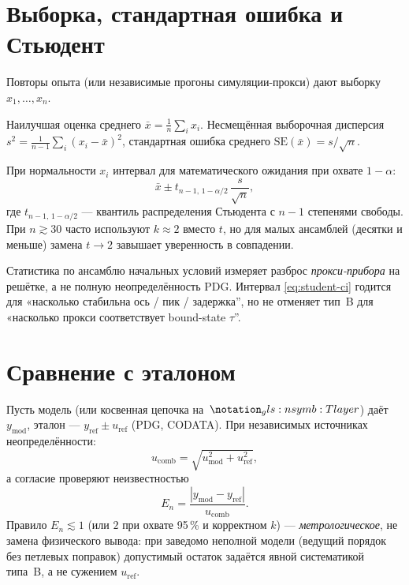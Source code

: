 \section{Выборка, стандартная ошибка и Стьюдент}
\label{sec:student}

Повторы опыта (или независимые прогоны симуляции-прокси) дают выборку $x_1,\ldots,x_n$.

\begin{definition}
\label{def:sample-stats}
Наилучшая оценка среднего $\bar x = \frac{1}{n}\sum_i x_i$.
Несмещённая выборочная дисперсия
$s^2 = \frac{1}{n-1}\sum_i (x_i-\bar x)^2$,
стандартная ошибка среднего $\mathrm{SE}(\bar x) = s/\sqrt{n}$.
\end{definition}

При нормальности $x_i$ интервал для математического ожидания при охвате $1-\alpha$:
\begin{equation}
\label{eq:student-ci}
  \bar x \pm t_{n-1,\,1-\alpha/2}\,\frac{s}{\sqrt{n}},
\end{equation}
где $t_{n-1,\,1-\alpha/2}$ --- квантиль распределения Стьюдента с $n-1$ степенями свободы.
При $n\gtrsim 30$ часто используют $k\approx 2$ вместо $t$, но для малых ансамблей
(десятки и меньше) замена $t\to 2$ завышает уверенность в совпадении.

\begin{remark}
Статистика по ансамблю начальных условий измеряет разброс \emph{прокси-прибора}
на решётке, а не полную неопределённость PDG.
Интервал \eqref{eq:student-ci} годится для «насколько стабильна ось / пик / задержка'',
но не отменяет тип~B для «насколько прокси соответствует bound-state $\tau$''.
\end{remark}

\section{Сравнение с эталоном}
\label{sec:compare-reference}

Пусть модель (или косвенная цепочка на~$\Tlayer$) даёт $y_{\mathrm{mod}}$,
эталон --- $y_{\mathrm{ref}}\pm u_{\mathrm{ref}}$ (PDG, CODATA).
При независимых источниках неопределённости:
\begin{equation}
\label{eq:combined-unc}
  u_{\mathrm{comb}} = \sqrt{u_{\mathrm{mod}}^2 + u_{\mathrm{ref}}^2},
\end{equation}
а согласие проверяют неизвестностью
\begin{equation}
\label{eq:en-score}
  E_n = \frac{|y_{\mathrm{mod}}-y_{\mathrm{ref}}|}{u_{\mathrm{comb}}}.
\end{equation}
Правило $E_n \lesssim 1$ (или $2$ при охвате 95\,\% и корректном $k$) --- \emph{метрологическое},
не замена физического вывода: при заведомо неполной модели
(ведущий порядок без петлевых поправок) допустимый остаток задаётся
явной систематикой типа~B, а не сужением $u_{\mathrm{ref}}$.

